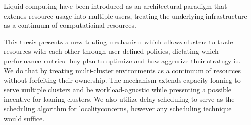 Liquid computing have been introduced as an architectural paradigm that extends
resource usage into multiple users, treating the underlying infrastructure as a
continuum of computatioinal resources. 

This thesis presents a new trading mechanism which allows clusters to trade
resources with each other through user-defined policies, dictating which
performance metrics they plan to optimize and how aggresive their strategy is.
We do that by treating multi-cluster environments as a continuum of resources
without forfeiting their ownership. The mechanism extends capacity loaning to
serve multiple clusters and be workload-agnostic while presenting a possible
incentive for loaning clusters. We also utilize delay scheduling to serve as
the scheduling algorithm for localityconcerns, however any scheduling technique
would suffice.
